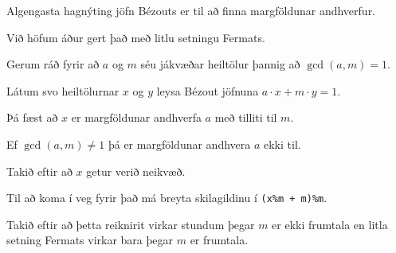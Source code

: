 {
	{
		\item<1-> Algengasta hagnýting jöfn Bézouts er til að finna margföldunar andhverfur.
		\item<2-> Við höfum áður gert það með litlu setningu Fermats.
		\item<3-> Gerum ráð fyrir að $a$ og $m$ séu jákvæðar heiltölur þannig að $\gcd(a, m) = 1$.
		\item<4-> Látum svo heiltölurnar $x$ og $y$ leysa Bézout jöfnuna $a \cdot x + m \cdot y = 1$.
		\item<5-> Þá fæst að $x$ er margföldunar andhverfa $a$ með tilliti til $m$.
		\item<6-> Ef $\gcd(a, m) \neq 1$ þá er margföldunar andhvera $a$ ekki til.
		\item<7->[] 
		\item<8-> Takið eftir að $x$ getur verið neikvæð.
		\item<9-> Til að koma í veg fyrir það má breyta skilagildinu í \texttt{(x\%m + m)\%m}.
	}
}

{
	{
		\item<1-> Takið eftir að þetta reiknirit virkar stundum þegar $m$ er ekki frumtala en litla setning Fermats virkar bara þegar $m$ er frumtala.
	}
}

{
}


